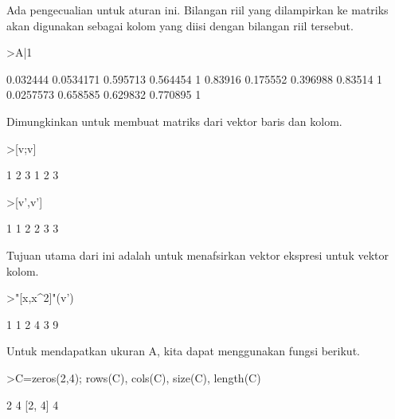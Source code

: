 \documentclass[a4paper,10pt]{article}
\begin{document}
\begin{eulernotebook}
\begin{eulercomment}
\begin{eulercomment}
\begin{eulercomment}
\begin{eulercomment}
\begin{eulercomment}
\begin{eulercomment}
\begin{eulercomment}
Ada pengecualian untuk aturan ini. Bilangan riil yang dilampirkan ke
matriks akan digunakan sebagai kolom yang diisi dengan bilangan riil
tersebut.
\end{eulercomment}
\begin{eulerprompt}
>A|1
\end{eulerprompt}
\begin{euleroutput}
       0.032444     0.0534171      0.595713      0.564454             1 
        0.83916      0.175552      0.396988       0.83514             1 
      0.0257573      0.658585      0.629832      0.770895             1 
\end{euleroutput}
\begin{eulercomment}
Dimungkinkan untuk membuat matriks dari vektor baris dan kolom.
\end{eulercomment}
\begin{eulerprompt}
>[v;v]
\end{eulerprompt}
\begin{euleroutput}
              1             2             3 
              1             2             3 
\end{euleroutput}
\begin{eulerprompt}
>[v',v']
\end{eulerprompt}
\begin{euleroutput}
              1             1 
              2             2 
              3             3 
\end{euleroutput}
\begin{eulercomment}
Tujuan utama dari ini adalah untuk menafsirkan vektor ekspresi untuk
vektor kolom.
\end{eulercomment}
\begin{eulerprompt}
>"[x,x^2]"(v')
\end{eulerprompt}
\begin{euleroutput}
              1             1 
              2             4 
              3             9 
\end{euleroutput}
\begin{eulercomment}
Untuk mendapatkan ukuran A, kita dapat menggunakan fungsi berikut.
\end{eulercomment}
\begin{eulerprompt}
>C=zeros(2,4); rows(C), cols(C), size(C), length(C)
\end{eulerprompt}
\begin{euleroutput}
  2
  4
  [2,  4]
  4
\end{euleroutput}
\begin{eulercomment}

\end{eulercomment}
\end{eulercomment}
\end{eulercomment}
\end{eulercomment}
\end{eulercomment}
\end{eulercomment}
\end{eulercomment}
\end{eulernotebook}
\end{document}
